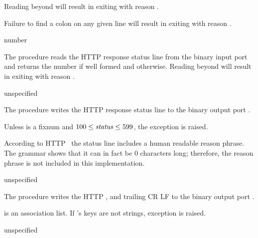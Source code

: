 Reading beyond  will result in exiting with reason
.

Failure to find a colon on any given line will result in exiting with
reason .

\begin{procedure}
\end{procedure}
\returns{} number \alt{} 

The  procedure reads the HTTP response status
line from the binary input port  and returns the number if
well formed and  otherwise. Reading beyond 
will result in exiting with reason .

\begin{procedure}
\end{procedure}
\returns{} unspecified

The  procedure writes the HTTP response
status line to the binary output port .

Unless  is a fixnum and $100 \leq \var{status} \leq 599$, the
exception  is
raised.

According to HTTP~\cite{RFC7230} the status line includes a human
readable reason phrase. The grammar shows that it can in fact be 0
characters long; therefore, the reason phrase is not included in this
implementation.

\begin{procedure}
\end{procedure}
\returns{} unspecified

The  procedure writes the HTTP ,
and trailing CR LF to the binary output port .

 is an association list. If 's keys are not
strings, exception 
is raised.

\begin{procedure}
\end{procedure}
\returns{} unspecified

